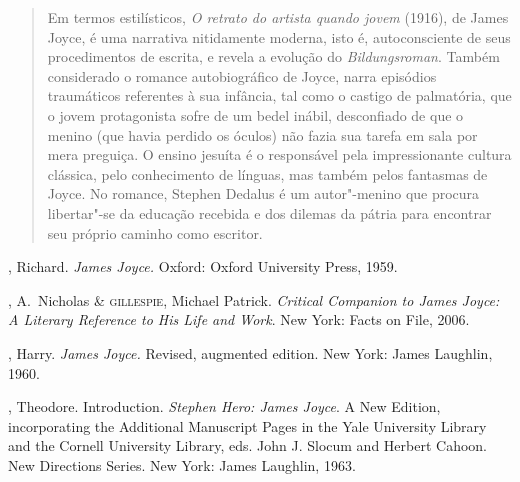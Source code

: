 \begin{quote}
Em termos estilísticos, \textit{O retrato do
artista quando jovem} (1916), de James Joyce, é uma
narrativa nitidamente moderna, isto é, autoconsciente de seus
procedimentos de escrita, e revela a evolução do
\textit{Bildungsroman}. Também considerado o
romance autobiográfico de Joyce, narra episódios traumáticos referentes
à sua infância, tal como o castigo de palmatória, que o jovem
protagonista sofre de um bedel inábil, desconfiado de que o menino (que
havia perdido os óculos) não fazia sua tarefa em sala por mera
preguiça. O ensino jesuíta é o responsável pela impressionante cultura
clássica, pelo conhecimento de línguas, mas também pelos fantasmas de
Joyce. No romance, Stephen Dedalus é um autor"-menino que procura
libertar"-se da educação recebida e dos dilemas da pátria para
encontrar seu próprio caminho como
escritor.
\end{quote}

\begin{bibliohedra}

, Richard.  \textit{James Joyce.}  Oxford: Oxford University
Press, 1959.

, A.~Nicholas \& \textsc{gillespie}, Michael Patrick. 
\textit{Critical Companion to James Joyce: A Literary Reference to His Life and Work}.
New York: Facts on File, 2006.

, Harry.  \textit{James Joyce.}  Revised, augmented edition.  New
York: James Laughlin, 1960.

, Theodore.  Introduction.  \textit{Stephen Hero: James Joyce}. 
A New Edition, incorporating the Additional Manuscript Pages in the Yale
University Library and the Cornell University Library, eds. John J.
Slocum and Herbert Cahoon.  New Directions Series.  New York: James
Laughlin, 1963.

\end{bibliohedra}
